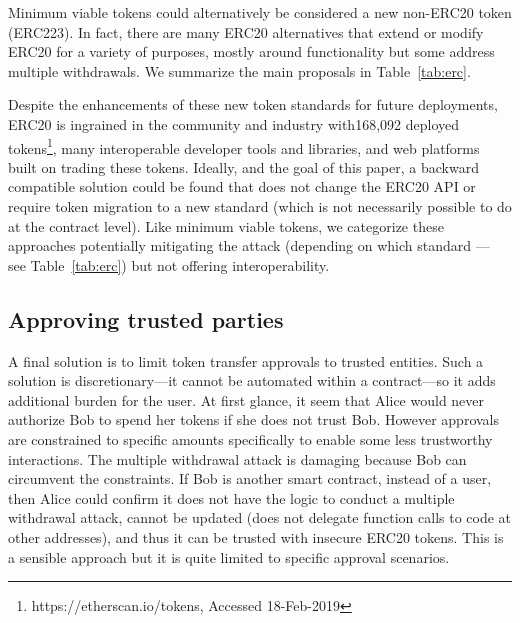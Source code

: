 Minimum viable tokens could alternatively be considered a new non-ERC20 token (\cf ERC223). In fact, there are many ERC20 alternatives that extend or modify ERC20 for a variety of purposes, mostly around functionality but some address multiple withdrawals. We summarize the main proposals in Table~\ref{tab:erc}. 

Despite the enhancements of these new token standards for future deployments, ERC20 is ingrained in the community and industry with168,092 deployed tokens\footnote{https://etherscan.io/tokens, Accessed 18-Feb-2019}, many interoperable developer tools and libraries, and web platforms built on trading these tokens. Ideally, and the goal of this paper, a backward compatible solution could be found that does not change the ERC20 API or require token migration to a new standard (which is not necessarily possible to do at the contract level). Like minimum viable tokens, we categorize these approaches potentially mitigating the attack (depending on which standard --- see Table~\ref{tab:erc}) but not offering interoperability.

\subsection{Approving trusted parties}

A final solution is to limit token transfer approvals to trusted entities. Such a solution is discretionary---it cannot be automated within a contract---so it adds additional burden for the user. At first glance, it seem that Alice would never authorize Bob to spend her tokens if she does not trust Bob. However approvals are constrained to specific amounts specifically to enable some less trustworthy interactions. The multiple withdrawal attack is damaging because Bob can circumvent the constraints. If Bob is another smart contract, instead of a user, then Alice could confirm it does not have the logic to conduct a multiple withdrawal attack, cannot be updated (\eg does not delegate function calls to code at other addresses), and thus it can be trusted with insecure ERC20 tokens. This is a sensible approach but it is quite limited to specific approval scenarios.
